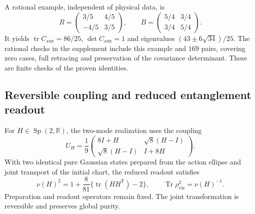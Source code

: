 A rational example, independent of physical data, is
\begin{equation}
 R=\begin{pmatrix}3/5&4/5\\-4/5&3/5\end{pmatrix},\qquad
 B=\begin{pmatrix}5/4&3/4\\3/4&5/4\end{pmatrix}.
 \label{md:aux:ejemplo-racional}
\end{equation}
It yields $\operatorname{tr}C_{\mathrm{aux}}=86/25$,
$\det C_{\mathrm{aux}}=1$ and eigenvalues
$(43\pm6\sqrt{34})/25$. The rational checks in the supplement include
this example and $169$ pairs, covering zero cases, full retracing and
preservation of the covariance determinant. These are finite checks
of the proven identities.

\subsection{Reversible coupling and reduced entanglement readout}
\label{md:aux:acoplamiento}

For $H\in\operatorname{Sp}(2,\mathbb R)$, the two-mode realization
uses the coupling
\begin{equation}
 U_H=\frac19\begin{pmatrix}
 8I+H&\sqrt8(H-I)\\
 \sqrt8(H-I)&I+8H
 \end{pmatrix}.
 \label{md:aux:acoplamiento-uh}
\end{equation}
With two identical pure Gaussian states prepared from the action
ellipse and joint transport of the initial chart, the reduced readout
satisfies
\begin{equation}
 \nu(H)^2=1+\frac8{81}
    \bigl\{\operatorname{tr}(HH^{\mathsf T})-2\bigr\},
 \qquad\operatorname{Tr}\rho_{\mathrm{vis}}^2=\nu(H)^{-1}.
 \label{md:aux:mezcla-generica}
\end{equation}
Preparation and readout operators remain fixed. The joint
transformation is reversible and preserves global purity.

